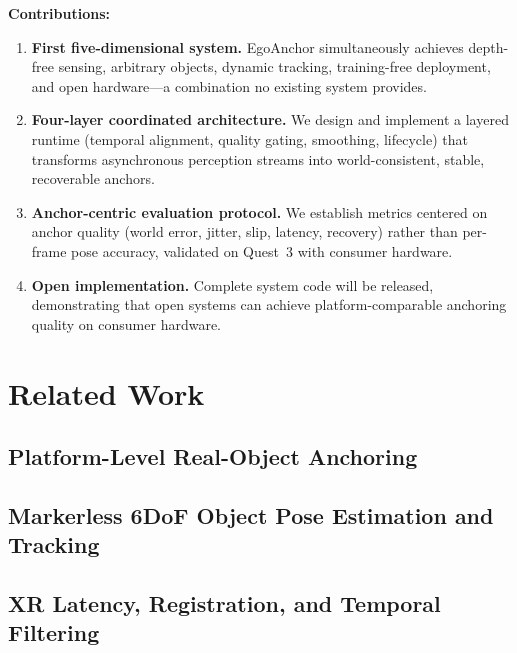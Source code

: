 \documentclass[review]{vgtc}
\begin{document}
\noindent\textbf{Contributions:}
\begin{enumerate}[leftmargin=1.4em]
  \item \textbf{First five-dimensional system.} EgoAnchor simultaneously achieves depth-free sensing, arbitrary objects, dynamic tracking, training-free deployment, and open hardware---a combination no existing system provides.
  \item \textbf{Four-layer coordinated architecture.} We design and implement a layered runtime (temporal alignment, quality gating, smoothing, lifecycle) that transforms asynchronous perception streams into world-consistent, stable, recoverable anchors.
  \item \textbf{Anchor-centric evaluation protocol.} We establish metrics centered on anchor quality (world error, jitter, slip, latency, recovery) rather than per-frame pose accuracy, validated on Quest~3 with consumer hardware.
  \item \textbf{Open implementation.} Complete system code will be released, demonstrating that open systems can achieve platform-comparable anchoring quality on consumer hardware.
\end{enumerate}


\section{Related Work}

\subsection{Platform-Level Real-Object Anchoring}

\subsection{Markerless 6DoF Object Pose Estimation and Tracking}

\subsection{XR Latency, Registration, and Temporal Filtering}
\end{document}
